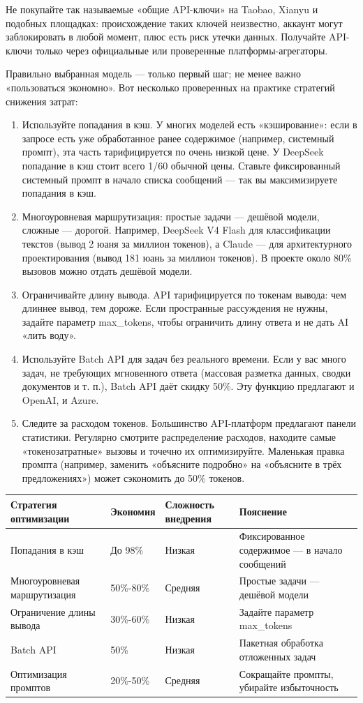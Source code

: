 Не покупайте так называемые «общие API-ключи» на Taobao, Xianyu и подобных площадках: происхождение таких ключей неизвестно, аккаунт могут заблокировать в любой момент, плюс есть риск утечки данных. Получайте API-ключи только через официальные или проверенные платформы-агрегаторы.


Правильно выбранная модель — только первый шаг; не менее важно «пользоваться экономно». Вот несколько проверенных на практике стратегий снижения затрат:

\begin{enumerate}
  \item Используйте попадания в кэш. У многих моделей есть «кэширование»: если в запросе есть уже обработанное ранее содержимое (например, системный промпт), эта часть тарифицируется по очень низкой цене. У DeepSeek попадание в кэш стоит всего 1/60 обычной цены. Ставьте фиксированный системный промпт в начало списка сообщений — так вы максимизируете попадания в кэш.
  \item Многоуровневая маршрутизация: простые задачи — дешёвой модели, сложные — дорогой. Например, DeepSeek V4 Flash для классификации текстов (вывод 2 юаня за миллион токенов), а Claude — для архитектурного проектирования (вывод 181 юань за миллион токенов). В проекте около 80\% вызовов можно отдать дешёвой модели.
  \item Ограничивайте длину вывода. API тарифицируется по токенам вывода: чем длиннее вывод, тем дороже. Если пространные рассуждения не нужны, задайте параметр max\_tokens, чтобы ограничить длину ответа и не дать AI «лить воду».
  \item Используйте Batch API для задач без реального времени. Если у вас много задач, не требующих мгновенного ответа (массовая разметка данных, сводки документов и т. п.), Batch API даёт скидку 50\%. Эту функцию предлагают и OpenAI, и Azure.
  \item Следите за расходом токенов. Большинство API-платформ предлагают панели статистики. Регулярно смотрите распределение расходов, находите самые «токенозатратные» вызовы и точечно их оптимизируйте. Маленькая правка промпта (например, заменить «объясните подробно» на «объясните в трёх предложениях») может сэкономить до 50\% токенов.
\end{enumerate}

\begin{center}
\begin{tabularx}{\linewidth}{|X|X|X|X|}
\hline
\textbf{Стратегия оптимизации} & \textbf{Экономия} & \textbf{Сложность внедрения} & \textbf{Пояснение} \tabularnewline
\hline
Попадания в кэш & До 98\% & Низкая & Фиксированное содержимое — в начало сообщений \tabularnewline
Многоуровневая маршрутизация & 50\%-80\% & Средняя & Простые задачи — дешёвой модели \tabularnewline
Ограничение длины вывода & 30\%-60\% & Низкая & Задайте параметр max\_tokens \tabularnewline
Batch API & 50\% & Низкая & Пакетная обработка отложенных задач \tabularnewline
Оптимизация промптов & 20\%-50\% & Средняя & Сокращайте промпты, убирайте избыточность \tabularnewline
\hline
\end{tabularx}
\end{center}

